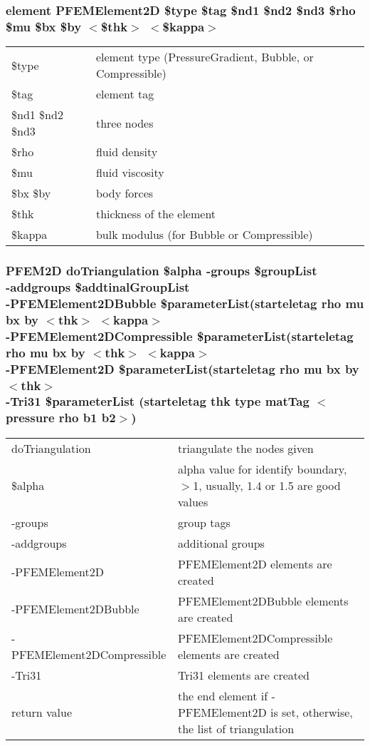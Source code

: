 \documentclass[12pt]{article}
\begin{document}
\subsubsection*{element PFEMElement2D \$type \$tag \$nd1 \$nd2 \$nd3 \$rho \$mu \$bx \$by $<$\$thk$>$ $<$\$kappa$>$}
\begin{tabular}{ll}
\$type & element type (PressureGradient, Bubble, or Compressible) \\
\$tag & element tag\\
\$nd1 \$nd2 \$nd3 & three nodes\\
\$rho & fluid density\\
\$mu & fluid viscosity\\
\$bx \$by & body forces\\
\$thk & thickness of the element\\
\$kappa & bulk modulus (for Bubble or Compressible)
\end{tabular}

\subsubsection*{PFEM2D doTriangulation \$alpha -groups \$groupList\\
-addgroups \$addtinalGroupList \\
-PFEMElement2DBubble 
\$parameterList(starteletag rho mu bx by $<$thk$>$ $<$kappa$>$\\
-PFEMElement2DCompressible
\$parameterList(starteletag rho mu bx by $<$thk$>$ $<$kappa$>$\\
-PFEMElement2D \$parameterList(starteletag rho mu bx by $<$thk$>$\\
-Tri31 \$parameterList (starteletag thk type matTag $<$pressure rho b1 b2$>$)}
\begin{tabular}{ll}
doTriangulation & triangulate the nodes given\\
\$alpha & alpha value for identify boundary, $>$1, usually, 1.4 or 1.5 are good values\\
-groups & group tags\\
-addgroups & additional groups\\
-PFEMElement2D & PFEMElement2D elements are created\\
-PFEMElement2DBubble & PFEMElement2DBubble elements are created\\
-PFEMElement2DCompressible & PFEMElement2DCompressible elements are created\\
-Tri31 & Tri31 elements are created\\
return value & the end element if -PFEMElement2D is set, otherwise, the list of triangulation
\end{tabular}
\end{document}
